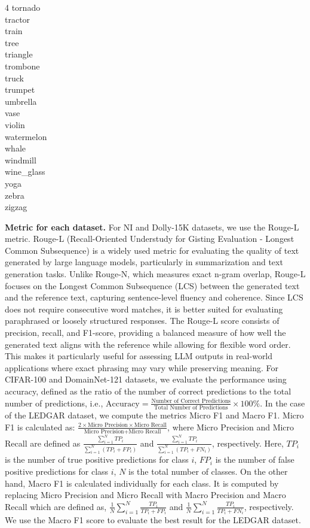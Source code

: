 \documentclass[sigconf]{acmart}
\begin{document}
\begin{multicols}{4}
tornado\\
tractor\\
train\\
tree\\
triangle\\
trombone\\
truck\\
trumpet\\
umbrella\\
vase\\
violin\\
watermelon\\
whale\\
windmill\\
wine\_glass\\
yoga\\
zebra\\
zigzag
\end{multicols}

\textbf{Metric for each dataset.} For NI and Dolly-15K datasets, we use the Rouge-L metric. Rouge-L (Recall-Oriented Understudy for Gisting Evaluation - Longest Common Subsequence) is a widely used metric for evaluating the quality of text generated by large language models, particularly in summarization and text generation tasks. Unlike Rouge-N, which measures exact n-gram overlap, Rouge-L focuses on the Longest Common Subsequence (LCS) between the generated text and the reference text, capturing sentence-level fluency and coherence. Since LCS does not require consecutive word matches, it is better suited for evaluating paraphrased or loosely structured responses. The Rouge-L score consists of precision, recall, and F1-score, providing a balanced measure of how well the generated text aligns with the reference while allowing for flexible word order. This makes it particularly useful for assessing LLM outputs in real-world applications where exact phrasing may vary while preserving meaning. For CIFAR-100 and DomainNet-121 datasets, we evaluate the performance using accuracy, defined as the ratio of the number of correct predictions to the total number of predictions, i.e., $\text{Accuracy} = \frac{\text{Number of Correct Predictions}}{\text{Total Number of Predictions}} \times 100\%$.
In the case of the LEDGAR dataset, we compute the metrics Micro F1 and Macro F1. Micro F1 is calculated as: $\frac{2 \times \text{Micro Precision} \times \text{Micro Recall}}{\text{Micro Precision} + \text{Micro Recall}}$, where Micro Precision and Micro Recall are defined as $\frac{\sum_{i=1}^{N} TP_i}{\sum_{i=1}^{N} (TP_i + FP_i)}$ and $\frac{\sum_{i=1}^{N} TP_i}{\sum_{i=1}^{N} (TP_i + FN_i)}$, respectively. Here, $TP_i$ is the number of true positive predictions for class $i$, $FP_i$ is the number of false positive predictions for class $i$, $N$ is the total number of classes. On the other hand, Macro F1 is calculated individually for each class. It is computed by replacing Micro Precision and Micro Recall with Macro Precision and Macro Recall which are defined as, $\frac{1}{N} \sum_{i=1}^{N} \frac{TP_i}{TP_i + FP_i}$ and $\frac{1}{N} \sum_{i=1}^{N} \frac{TP_i}{TP_i + FN_i}$, respectively. We use the Macro F1 score to evaluate the best result for the LEDGAR dataset.
\end{document}
